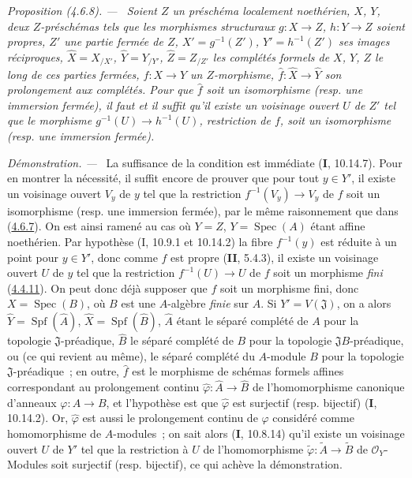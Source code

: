 \documentclass[10pt,oneside]{book}
\newenvironment{proposition}[1][]{%
  \par\medskip\noindent\itshape Proposition (#1). ---\ }{\par}
\newenvironment{proof}{%
  \par\medskip\noindent\textit{Démonstration. ---\ }}{\par}
\begin{document}
\begin{proposition}[4.6.8]
\label{III.4.6.8-fr}
Soient $Z$ un préschéma localement noethérien, $X$, $Y$, deux $Z$-préschémas
tels que les morphismes structuraux $g:X\to Z$, $h:Y\to Z$ soient propres,
$Z'$ une partie fermée de $Z$, $X'=g^{-1}(Z')$, $Y'=h^{-1}(Z')$ ses images
réciproques,
$\widehat X=X_{/X'}$, $\widehat Y=Y_{/Y'}$, $\widehat Z=Z_{/Z'}$
les complétés formels de $X$, $Y$, $Z$ le long de ces parties fermées,
$f:X\to Y$ un $Z$-morphisme, $\widehat f:\widehat X\to\widehat Y$ son
prolongement aux complétés. Pour que $\widehat f$ soit un isomorphisme (\textup{resp.}
une immersion fermée), il faut et il suffit qu'il existe un voisinage ouvert
$U$ de $Z'$ tel que le morphisme $g^{-1}(U)\to h^{-1}(U)$, restriction de
$f$, soit un isomorphisme (\textup{resp.} une immersion fermée).
\end{proposition}

\begin{proof}
La suffisance de la condition est immédiate (\textbf{I}, 10.14.7). Pour en montrer la
nécessité, il suffit encore de prouver que pour tout $y\in Y'$, il existe un
voisinage ouvert $V_y$ de $y$ tel que la restriction
$f^{-1}(V_y)\to V_y$ de $f$ soit un isomorphisme (resp. une immersion
fermée), par le même raisonnement que dans
(\hyperref[III.4.6.7-fr]{4.6.7}). On est ainsi ramené au cas où $Y=Z$,
$Y=\operatorname{Spec}(A)$ étant affine noethérien. Par hypothèse
(I, 10.9.1 et 10.14.2) la fibre $f^{-1}(y)$ est réduite à un point pour
$y\in Y'$, donc comme $f$ est propre (\textbf{II}, 5.4.3), il existe un voisinage
ouvert $U$ de $y$ tel que la restriction $f^{-1}(U)\to U$ de $f$ soit un
morphisme \emph{fini} (\hyperref[III.4.4.11-fr]{4.4.11}). On peut donc déjà supposer
que $f$ soit un morphisme fini, donc $X=\operatorname{Spec}(B)$, où $B$ est
une $A$-algèbre \emph{finie} sur $A$. Si $Y'=V(\mathfrak J)$, on a alors
$\widehat Y=\operatorname{Spf}(\widehat A)$, $\widehat X=\operatorname{Spf}(\widehat B)$,
$\widehat A$ étant le séparé complété de $A$ pour la topologie
$\mathfrak J$-préadique, $\widehat B$ le séparé complété de $B$ pour la
topologie $\mathfrak JB$-préadique, ou (ce qui revient au même), le séparé
complété du $A$-module $B$ pour la topologie $\mathfrak J$-préadique~; en
outre, $\widehat f$ est le morphisme de schémas formels affines correspondant
au prolongement continu $\widehat\varphi:\widehat A\to\widehat B$ de
l'homomorphisme canonique d'anneaux $\varphi:A\to B$, et l'hypothèse est que
$\widehat\varphi$ est surjectif (resp. bijectif) (\textbf{I}, 10.14.2). Or,
$\widehat\varphi$ est aussi le prolongement continu de $\varphi$ considéré
comme homomorphisme de $A$-modules~; on sait alors (\textbf{I}, 10.8.14) qu'il existe
un voisinage ouvert $U$ de $Y'$ tel que la restriction à $U$ de
l'homomorphisme $\widetilde\varphi:\widetilde A\to\widetilde B$ de
$\mathcal O_Y$-Modules soit surjectif (resp. bijectif), ce qui achève la
démonstration.
\end{proof}
\end{document}
